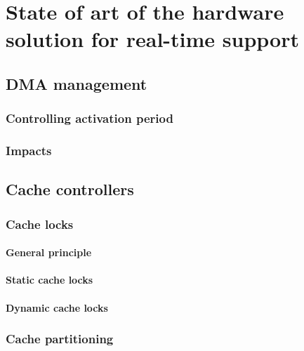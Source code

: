 
\chapter{State of art of the hardware solution for real-time support}
\doMinitoc

\section{DMA management}

\subsection{Controlling activation period}

\subsection{Impacts}

\section{Cache controllers}

\subsection{Cache locks}

\subsubsection{General principle}

\subsubsection{Static cache locks}

\subsubsection{Dynamic cache locks}

\subsection{Cache partitioning}

